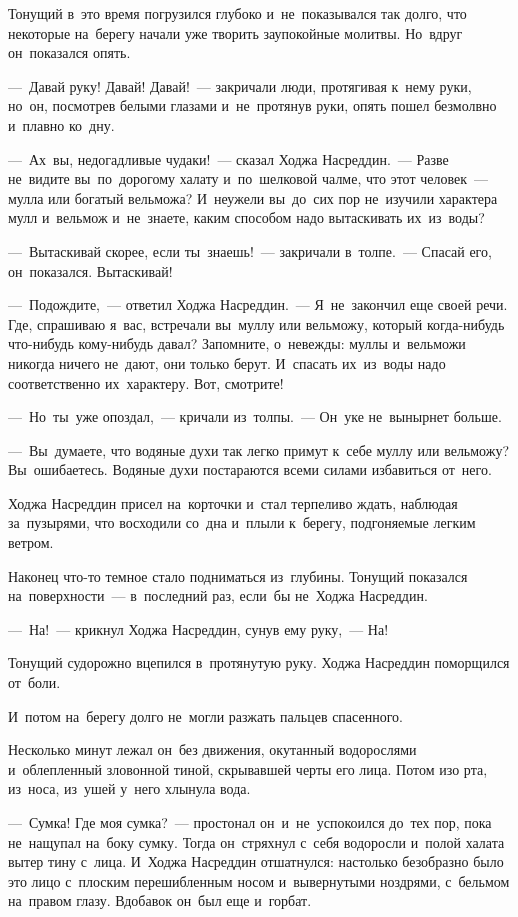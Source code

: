 \documentclass[12pt,a4paper]{book}
\begin{document}
Тонущий в~это время погрузился глубоко и~не~показывался так долго, что некоторые на~берегу начали уже творить заупокойные молитвы. Но~вдруг он~показался опять.

—~Давай руку! Давай! Давай!~— закричали люди, протягивая к~нему руки, но~он, посмотрев белыми глазами и~не~протянув руки, опять пошел безмолвно и~плавно ко~дну.

—~Ах~вы, недогадливые чудаки!~— сказал Ходжа Насреддин.~— Разве не~видите вы~по~дорогому халату и~по~шелковой чалме, что этот человек~— мулла или богатый вельможа? И~неужели вы~до~сих пор не~изучили характера мулл и~вельмож и~не~знаете, каким способом надо вытаскивать их~из~воды?

—~Вытаскивай скорее, если ты~знаешь!~— закричали в~толпе.~— Спасай его, он~показался. Вытаскивай!

—~Подождите,~— ответил Ходжа Насреддин.~— Я~не~закончил еще своей речи. Где, спрашиваю я~вас, встречали вы~муллу или вельможу, который когда-нибудь что-нибудь кому-нибудь давал? Запомните, о~невежды: муллы и~вельможи никогда ничего не~дают, они только берут. И~спасать их~из~воды надо соответственно их~характеру. Вот, смотрите!

—~Но~ты~уже опоздал,~— кричали из~толпы.~— Он~уке не~вынырнет больше.

—~Вы~думаете, что водяные духи так легко примут к~себе муллу или вельможу? Вы~ошибаетесь. Водяные духи постараются всеми силами избавиться от~него.

Ходжа Насреддин присел на~корточки и~стал терпеливо ждать, наблюдая за~пузырями, что восходили со~дна и~плыли к~берегу, подгоняемые легким ветром.

Наконец что-то темное стало подниматься из~глубины. Тонущий показался на~поверхности~— в~последний раз, если~бы не~Ходжа Насреддин.

—~На!~— крикнул Ходжа Насреддин, сунув ему руку,~— На!

Тонущий судорожно вцепился в~протянутую руку. Ходжа Насреддин поморщился от~боли.

И~потом на~берегу долго не~могли разжать пальцев спасенного.

Несколько минут лежал он~без движения, окутанный водорослями и~облепленный зловонной тиной, скрывавшей черты его лица. Потом изо рта, из~носа, из~ушей у~него хлынула вода.

—~Сумка! Где моя сумка?~— простонал он~и~не~успокоился до~тех пор, пока не~нащупал на~боку сумку. Тогда он~стряхнул с~себя водоросли и~полой халата вытер тину с~лица. И~Ходжа Насреддин отшатнулся: настолько безобразно было это лицо с~плоским перешибленным носом и~вывернутыми ноздрями, с~бельмом на~правом глазу. Вдобавок он~был еще и~горбат.
\end{document}
